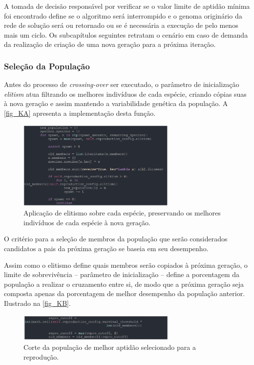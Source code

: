 A tomada de decisão responsável por verificar se o valor limite de aptidão mínima foi encontrado define se o algoritmo será interrompido e o genoma originário da rede de solução será ou  retornado ou se é necessária a execução de pelo menos mais um ciclo. Os subcapítulos seguintes retratam o cenário em caso de demanda da realização de criação de uma nova geração para a próxima iteração.

\subsubsection{Seleção da População}
Antes do processo de \textit{crossing-over} ser executado, o parâmetro de inicialização \textit{elitism} atua filtrando os melhores indivíduos de cada espécie, criando cópias suas à nova geração e assim mantendo a variabilidade genética da população. A \autoref{fig_KA} apresenta a implementação desta função.

\begin{figure}[htb]
        \centering
        \caption{\label{fig_KA}Aplicação de elitismo sobre cada espécie, preservando os melhores indivíduos de cada espécie à nova geração.}
        \includegraphics[width=0.7\textwidth]{images/KA.png}
\end{figure}

O critério para a seleção de membros da população que serão considerados candidatos a pais da próxima geração se baseia em seu desempenho.

Assim como o elitismo define quais membros serão copiados à próxima geração, o limite de sobrevivência – parâmetro de inicialização – define a porcentagem da população a realizar o cruzamento entre si, de modo que a próxima geração seja composta apenas da porcentagem de melhor desempenho da população anterior. Ilustrado na \autoref{fig_KB}.

\begin{figure}[htb]
        \centering
        \caption{\label{fig_KB}Corte da população de melhor aptidão selecionado para a reprodução.}
        \includegraphics[width=0.7\textwidth]{images/KB.png}
\end{figure}

